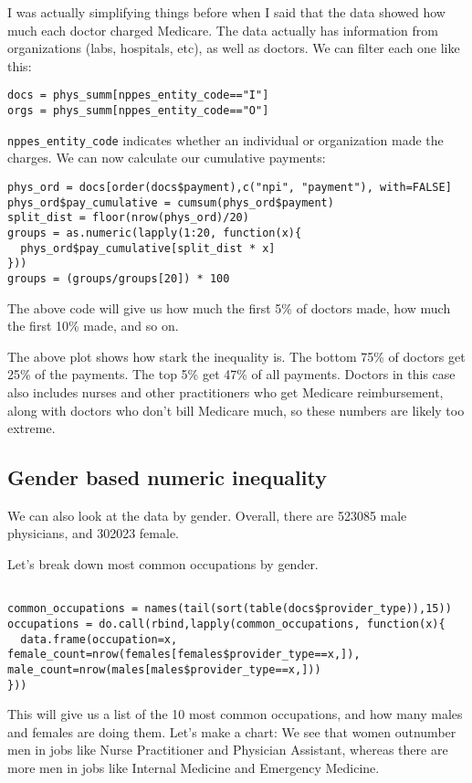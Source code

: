 I was actually simplifying things before when I said that the data showed how much each doctor charged Medicare. The data actually has information from organizations (labs, hospitals, etc), as well as doctors. We can filter each one like this:

\begin{framed}
\begin{verbatim}
docs = phys_summ[nppes_entity_code=="I"]
orgs = phys_summ[nppes_entity_code=="O"]
\end{verbatim}
\end{framed}

\texttt{nppes\_entity\_code} indicates whether an individual or organization made the charges. We can now calculate our cumulative payments:

\begin{framed}
\begin{verbatim}
phys_ord = docs[order(docs$payment),c("npi", "payment"), with=FALSE]
phys_ord$pay_cumulative = cumsum(phys_ord$payment)
split_dist = floor(nrow(phys_ord)/20)
groups = as.numeric(lapply(1:20, function(x){
  phys_ord$pay_cumulative[split_dist * x]
}))
groups = (groups/groups[20]) * 100
\end{verbatim}
\end{framed}

The above code will give us how much the first 5\% of doctors made, how much the first 10\% made, and so on.

The above plot shows how stark the inequality is. The bottom 75\% of doctors get 25\% of the payments. The top 5\% get 47\% of all payments. Doctors in this case also includes nurses and other practitioners who get Medicare reimbursement, along with doctors who don't bill Medicare much, so these numbers are likely too extreme.

\subsection*{Gender based numeric inequality}
We can also look at the data by gender. Overall, there are 523085 male physicians, and 302023 female.

Let's break down most common occupations by gender.

\begin{framed}
\begin{verbatim}

common_occupations = names(tail(sort(table(docs$provider_type)),15))
occupations = do.call(rbind,lapply(common_occupations, function(x){
  data.frame(occupation=x, female_count=nrow(females[females$provider_type==x,]), male_count=nrow(males[males$provider_type==x,]))
}))
\end{verbatim}
\end{framed}
This will give us a list of the 10 most common occupations, and how many males and females are doing them. Let's make a chart:
We see that women outnumber men in jobs like Nurse Practitioner and Physician Assistant, whereas there are more men in jobs like Internal Medicine and Emergency Medicine.

